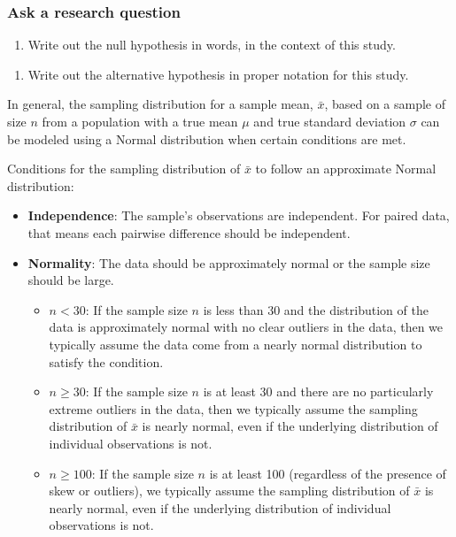 \documentclass[
]{report}
\providecommand{\tightlist}{%
  \setlength{\itemsep}{0pt}\setlength{\parskip}{0pt}}
\begin{document}
\hypertarget{ask-a-research-question-3}{%
\subsubsection*{Ask a research question}\label{ask-a-research-question-3}}

\begin{enumerate}
\def\labelenumi{\arabic{enumi}.}
\setcounter{enumi}{2}
\tightlist
\item
  Write out the null hypothesis in words, in the context of this study.
\end{enumerate}

\vspace{0.8in}

\begin{enumerate}
\def\labelenumi{\arabic{enumi}.}
\setcounter{enumi}{3}
\tightlist
\item
  Write out the alternative hypothesis in proper notation for this study.
\end{enumerate}

\vspace{0.5in}

In general, the sampling distribution for a sample mean, \(\bar{x}\), based on a sample of size \(n\) from a population with a true mean \(\mu\) and true standard deviation \(\sigma\) can be modeled using a Normal distribution when certain conditions are met.

Conditions for the sampling distribution of \(\bar{x}\) to follow an approximate Normal distribution:

\begin{itemize}
\item
  \textbf{Independence}: The sample's observations are independent. For paired data, that means each pairwise difference should be independent.
\item
  \textbf{Normality}: The data should be approximately normal or the sample size should be large.

  \begin{itemize}
  \item
    \(n < 30\): If the sample size \(n\) is less than 30 and the distribution of the data is approximately normal with no clear outliers in the data, then we typically assume the data come from a nearly normal distribution to satisfy the condition.
  \item
    \(n \geq 30\): If the sample size \(n\) is at least 30 and there are no particularly extreme outliers in the data, then we typically assume the sampling distribution of \(\bar{x}\) is nearly normal, even if the underlying distribution of individual observations is not.
  \item
    \(n \geq 100\): If the sample size \(n\) is at least 100 (regardless of the presence of skew or outliers), we typically assume the sampling distribution of \(\bar{x}\) is nearly normal, even if the underlying distribution of individual observations is not.
  \end{itemize}
\end{itemize}
\end{document}
